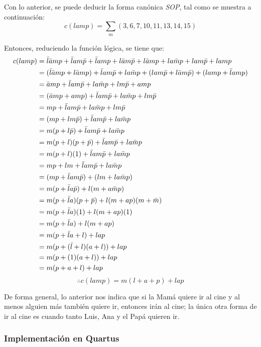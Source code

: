 \documentclass[../procedimientos.tex]{subfiles}
\begin{document}
Con lo anterior, se puede deducir la forma canónica \textit{SOP}, tal como se 
muestra a continuación:
\begin{equation*}
  c(lamp) = \sum_m (3, 6, 7, 10, 11, 13, 14, 15)
\end{equation*}

Entonces, reduciendo la función lógica, se tiene que:
\begin{align*}
  c(lamp) &= \bar{l}\bar{a}mp + \bar{l}am\bar{p} + \bar{l}amp  + l\bar{a}m\bar{p} + 
  l\bar{a}mp + la\bar{m}p + lam\bar{p} + lamp\\
  &= (\bar{l}\bar{a}mp + l\bar{a}mp) + \bar{l}am\bar{p} + la\bar{m}p + (lam\bar{p} + 
  l\bar{a}m\bar{p}) + (lamp + \bar{l}amp)\\
  &= \bar{a}mp + \bar{l}am\bar{p} + la\bar{m}p + lm\bar{p} + amp\\
  &= (\bar{a}mp + amp) + \bar{l}am\bar{p} + la\bar{m}p + lm\bar{p}\\
  &= mp + \bar{l}am\bar{p} + la\bar{m}p + lm\bar{p}\\
  &= (mp + lm\bar{p}) + \bar{l}am\bar{p} + la\bar{m}p\\
  &= m(p + l\bar{p}) + \bar{l}am\bar{p} + la\bar{m}p\\
  &= m(p + l)(p + \bar{p}) + \bar{l}am\bar{p} + la\bar{m}p\\
  &= m(p + l)(1) + \bar{l}am\bar{p} + la\bar{m}p\\
  &= mp + lm + \bar{l}am\bar{p} + la\bar{m}p\\
  &= (mp + \bar{l}am\bar{p}) + (lm + la\bar{m}p)\\
  &= m(p + \bar{l}a\bar{p}) + l(m + a\bar{m}p)\\
  &= m(p + \bar{l}a)(p + \bar{p}) + l(m + ap)(m + \bar{m})\\
  &= m(p + \bar{l}a)(1) + l(m + ap)(1)\\
  &= m(p + \bar{l}a) + l(m + ap)\\
  &= m(p + \bar{l}a + l) + lap\\
  &= m(p + (\bar{l} + l)(a + l)) + lap\\
  &= m(p + (1)(a + l)) + lap\\
  &= m(p + a + l) + lap
\end{align*}
\begin{equation*}
  \boxed {
    \therefore c(lamp) = m (l + a + p) + lap
  }
\end{equation*}

De forma general, lo anterior nos indica que si la Mamá quiere ir al cine y al 
menos alguien más también quiere ir, entonces irán al cine; la única otra 
forma de ir al cine es cuando tanto Luis, Ana y el Papá quieren ir.

\subsubsection{Implementación en Quartus}
\end{document}
